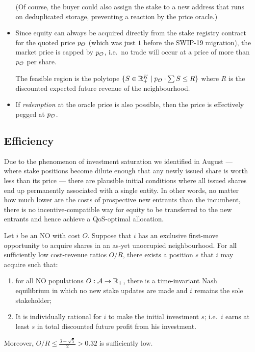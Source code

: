 \begin{itemize}
  (Of course, the buyer could also assign the stake to a new address that runs on deduplicated storage, preventing a reaction by the price oracle.)

  \item Since equity can always be acquired directly from the stake registry contract for the quoted price $p_{\mathcal{O}}$ (which was just $1$ before the SWIP-19 migration), the market price is capped by $p_{\mathcal{O}}$, i.e.~no trade will occur at a price of more than $p_{\mathcal{O}}$ per share.

  The feasible region is the polytope $\{S\in\mathbb{R}_+^K\mid p_{\mathcal{O}}\cdot\sum S \leq R\}$ where $R$ is the discounted expected future revenue of the neighbourhood.

  \item If \emph{redemption} at the oracle price is also possible, then the price is effectively pegged at $p_{\mathcal{O}}$.
\end{itemize}

\subsection{Efficiency}

Due to the phenomenon of investment saturation we identified in August --- where stake positions become dilute enough that any newly issued share is worth less than its price --- there are plausible initial conditions where all issued shares end up permanently associated with a single entity.
%
In other words, no matter how much lower are the costs of prospective new entrants than the incumbent, there is no incentive-compatible way for equity to be transferred to the new entrants and hence achieve a QoS-optimal allocation.

\begin{proposition*}
  Let $i$ be an NO with cost $O$. 
  Suppose that $i$ has an exclusive first-move opportunity to acquire shares in an as-yet unoccupied neighbourhood.
  For all sufficiently low cost-revenue ratios $O/R$, there exists a position $s$ that $i$ may acquire such that:
  \begin{enumerate}
    \item for all NO populations $O:\mathcal{A}\rightarrow\mathbb{R}_+$, there is a time-invariant Nash equilibrium in which no new stake updates are made and $i$ remains the sole stakeholder;
    \item It is individually rational for $i$ to make the initial investment $s$; i.e.~$i$ earns at least $s$ in total discounted future profit from his investment.
  \end{enumerate}
  Moreover, $O/R\leq \frac{3-\sqrt{5}}{2}> 0.32$ is sufficiently low.
\end{proposition*}

